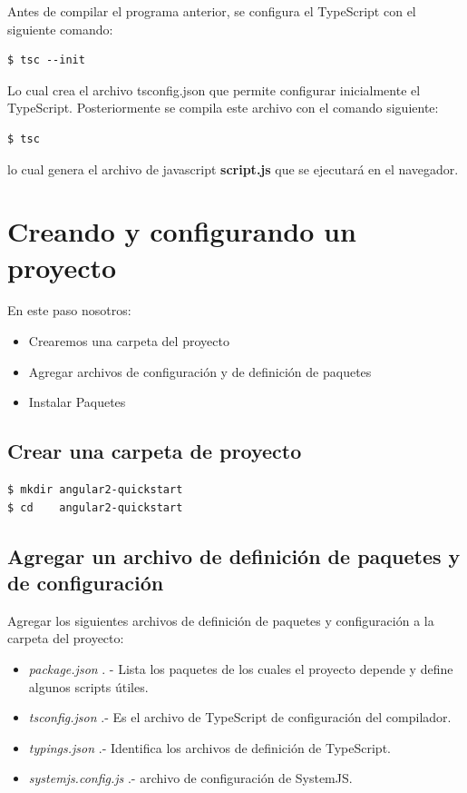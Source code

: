 \documentclass[12pt,twoside]{book}
\begin{document}
Antes de compilar el programa anterior, se configura el TypeScript con el siguiente comando:

\begin{lstlisting}[language=html]
$ tsc --init 
\end{lstlisting}
Lo cual crea el archivo tsconfig.json que permite configurar inicialmente el TypeScript. Posteriormente se compila este archivo con el comando siguiente:

\begin{lstlisting}[language=html]
$ tsc 
\end{lstlisting}

lo cual genera el archivo de javascript \textbf{script.js} que se ejecutará en el navegador.

\section{Creando y configurando un proyecto}

En este paso nosotros:

\begin{itemize}
\item Crearemos una carpeta del proyecto
\item Agregar archivos de configuración y de definición de paquetes
\item Instalar Paquetes
\end{itemize}

\subsection{Crear una carpeta de proyecto}

\begin{lstlisting}[language=bash]
$ mkdir angular2-quickstart
$ cd    angular2-quickstart
\end{lstlisting}

\subsection{Agregar un archivo de definición de paquetes y de configuración}

Agregar los siguientes archivos de definición de paquetes y configuración a la carpeta del proyecto:

\begin{itemize}
\item \emph{package.json} . - Lista los paquetes de los cuales el proyecto depende y define algunos scripts útiles.
\item \emph{tsconfig.json}  .- Es el archivo de TypeScript de configuración del compilador.
\item \emph{typings.json} .- Identifica los archivos de definición de TypeScript.
\item \emph{systemjs.config.js} .- archivo de configuración de SystemJS.
\end{itemize}
\end{document}
